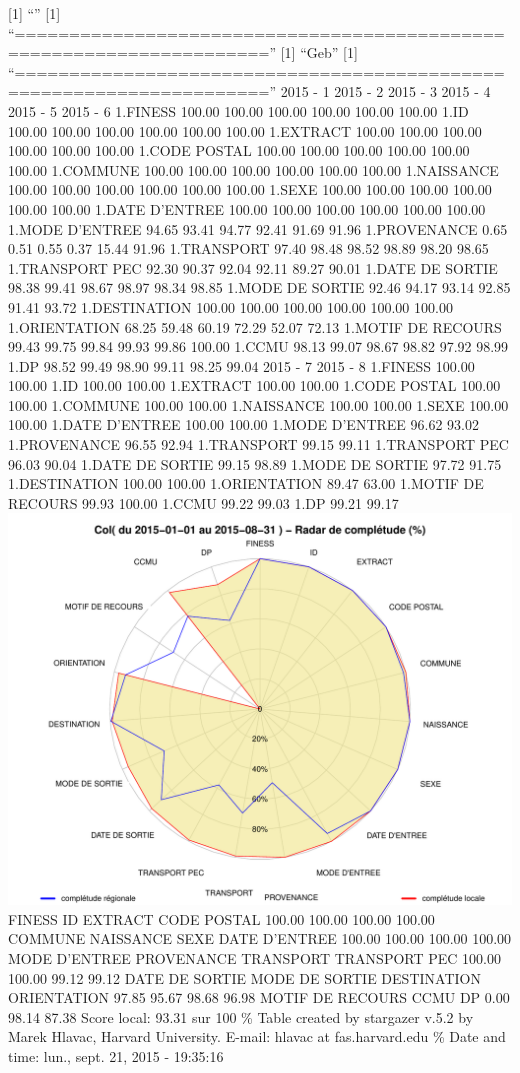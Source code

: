 \documentclass[]{article}
\begin{document}
{[}1{]} ``'' {[}1{]}
``=====================================================================''
{[}1{]} ``Geb'' {[}1{]}
``=====================================================================''
2015 - 1 2015 - 2 2015 - 3 2015 - 4 2015 - 5 2015 - 6 1.FINESS 100.00
100.00 100.00 100.00 100.00 100.00 1.ID 100.00 100.00 100.00 100.00
100.00 100.00 1.EXTRACT 100.00 100.00 100.00 100.00 100.00 100.00 1.CODE
POSTAL 100.00 100.00 100.00 100.00 100.00 100.00 1.COMMUNE 100.00 100.00
100.00 100.00 100.00 100.00 1.NAISSANCE 100.00 100.00 100.00 100.00
100.00 100.00 1.SEXE 100.00 100.00 100.00 100.00 100.00 100.00 1.DATE
D'ENTREE 100.00 100.00 100.00 100.00 100.00 100.00 1.MODE D'ENTREE 94.65
93.41 94.77 92.41 91.69 91.96 1.PROVENANCE 0.65 0.51 0.55 0.37 15.44
91.96 1.TRANSPORT 97.40 98.48 98.52 98.89 98.20 98.65 1.TRANSPORT PEC
92.30 90.37 92.04 92.11 89.27 90.01 1.DATE DE SORTIE 98.38 99.41 98.67
98.97 98.34 98.85 1.MODE DE SORTIE 92.46 94.17 93.14 92.85 91.41 93.72
1.DESTINATION 100.00 100.00 100.00 100.00 100.00 100.00 1.ORIENTATION
68.25 59.48 60.19 72.29 52.07 72.13 1.MOTIF DE RECOURS 99.43 99.75 99.84
99.93 99.86 100.00 1.CCMU 98.13 99.07 98.67 98.82 97.92 98.99 1.DP 98.52
99.49 98.90 99.11 98.25 99.04 2015 - 7 2015 - 8 1.FINESS 100.00 100.00
1.ID 100.00 100.00 1.EXTRACT 100.00 100.00 1.CODE POSTAL 100.00 100.00
1.COMMUNE 100.00 100.00 1.NAISSANCE 100.00 100.00 1.SEXE 100.00 100.00
1.DATE D'ENTREE 100.00 100.00 1.MODE D'ENTREE 96.62 93.02 1.PROVENANCE
96.55 92.94 1.TRANSPORT 99.15 99.11 1.TRANSPORT PEC 96.03 90.04 1.DATE
DE SORTIE 99.15 98.89 1.MODE DE SORTIE 97.72 91.75 1.DESTINATION 100.00
100.00 1.ORIENTATION 89.47 63.00 1.MOTIF DE RECOURS 99.93 100.00 1.CCMU
99.22 99.03 1.DP 99.21 99.17
\includegraphics{completude_files/figure-latex/finess-13.pdf} FINESS ID
EXTRACT CODE POSTAL 100.00 100.00 100.00 100.00 COMMUNE NAISSANCE SEXE
DATE D'ENTREE 100.00 100.00 100.00 100.00 MODE D'ENTREE PROVENANCE
TRANSPORT TRANSPORT PEC 100.00 100.00 99.12 99.12 DATE DE SORTIE MODE DE
SORTIE DESTINATION ORIENTATION 97.85 95.67 98.68 96.98 MOTIF DE RECOURS
CCMU DP 0.00 98.14 87.38 Score local: 93.31 sur 100 \% Table created by
stargazer v.5.2 by Marek Hlavac, Harvard University. E-mail: hlavac at
fas.harvard.edu \% Date and time: lun., sept. 21, 2015 - 19:35:16
\end{document}
